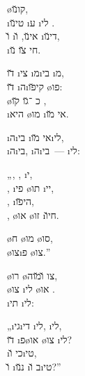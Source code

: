 
  \o{קו}\u{נו}, \\
\i{טי}\u{נו} \i{ע} \i{לי}   .\\
\u{ו}  \i{אי}\u{נו}, \u{ו}  \i{די}\u{נו},\\
  \i{חי} \u{צו} \u{נו}.

\u{דו}  \i{צי} \i{מ}\i{בי} \i{מ},\\
\u{דו} \i{ה}\i{קי}\u{פו}  \o{פו}:\\
\o{כ}  ־\u{גו} \u{קו} ,\\
\i{היא} \o{מו} \i{אי}   \u{מו}.

 \i{ה}\i{בי} \i{אי} \u{מו}\i{לי},\\
\i{ה}\i{בי}, \i{ה}\i{בי}~—   \i{לי}:

„, ,  \i{י},\\
,  \i{פי} \o{תו} \i{יי},\\
,     \i{הי}\u{פו},\\
,  \o{או}  \o{זו} \i{חי}\u{ו}.

  \o{ח} \o{מו}  \o{סו},\\
  \o{צו}\i{פ} \o{צו}.”

\o{רו}  \o{צו} \u{ו}\u{מו}ה,\\
\o{צו}  \i{לי} \o{או} .\\
\i{תי} \i{לי}:

„\i{גי}\i{די} \i{לי}, \i{לי},\\
\u{דו} \i{פ}\o{או}  \o{צו} \i{לי}?\\
  \i{כי} \u{ו}\i{טי},\\
\u{ו} \i{נ}\u{נו} \i{ב} \u{ו}\i{טי}?”


